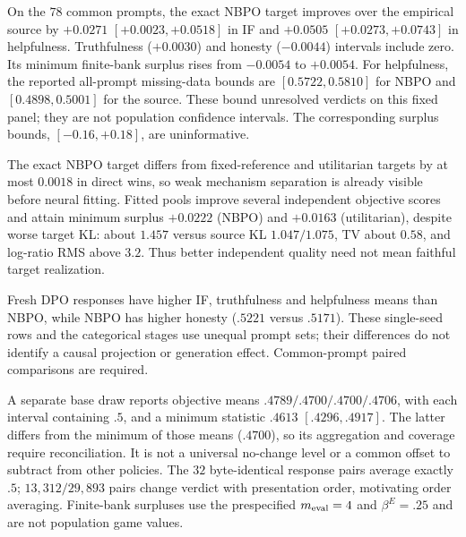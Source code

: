 \documentclass{article}
\theoremstyle{remark}
\theoremstyle{plain}
\begin{document}
On the $78$ common prompts, the exact NBPO target improves over the empirical source by $+0.0271$ $[+0.0023,+0.0518]$ in IF and $+0.0505$ $[+0.0273,+0.0743]$ in helpfulness. Truthfulness ($+0.0030$) and honesty ($-0.0044$) intervals include zero. Its minimum finite-bank surplus rises from $-0.0054$ to $+0.0054$. For helpfulness, the reported all-prompt missing-data bounds are $[0.5722,0.5810]$ for NBPO and $[0.4898,0.5001]$ for the source. These bound unresolved verdicts on this fixed panel; they are not population confidence intervals. The corresponding surplus bounds, $[-0.16,+0.18]$, are uninformative.

The exact NBPO target differs from fixed-reference and utilitarian targets by at most $0.0018$ in direct wins, so weak mechanism separation is already visible before neural fitting. Fitted pools improve several independent objective scores and attain minimum surplus $+0.0222$ (NBPO) and $+0.0163$ (utilitarian), despite worse target KL: about $1.457$ versus source KL $1.047/1.075$, TV about $0.58$, and log-ratio RMS above $3.2$. Thus better independent quality need not mean faithful target realization.

Fresh DPO responses have higher IF, truthfulness and helpfulness means than NBPO, while NBPO has higher honesty ($.5221$ versus $.5171$). These single-seed rows and the categorical stages use unequal prompt sets; their differences do not identify a causal projection or generation effect. Common-prompt paired comparisons are required.

A separate base draw reports objective means $.4789/.4700/.4700/.4706$, with each interval containing $.5$, and a minimum statistic $.4613$ $[.4296,.4917]$. The latter differs from the minimum of those means ($.4700$), so its aggregation and coverage require reconciliation. It is not a universal no-change level or a common offset to subtract from other policies. The $32$ byte-identical response pairs average exactly $.5$; $13{,}312/29{,}893$ pairs change verdict with presentation order, motivating order averaging. Finite-bank surpluses use the prespecified $m_{\rm eval}=4$ and $\beta^E=.25$ and are not population game values.
\end{document}
